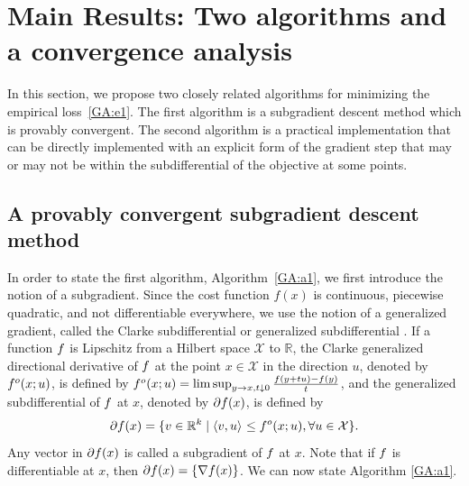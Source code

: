 
\section{Main Results:
Two algorithms and a convergence analysis
} \label{GA:s1}

In this section, we propose two closely related algorithms for minimizing the empirical loss~\eqref{GA:e1}.  The first algorithm is a subgradient descent method which is provably convergent.  The second algorithm is a practical implementation that can be directly implemented with an explicit form of the gradient step that may or may not be within the subdifferential of the objective at some points.

\subsection{A provably convergent subgradient descent method}

In order to state the first algorithm,  Algorithm~\ref{GA:a1}, we first introduce the notion of a subgradient.
Since the cost function $f(x)$ is continuous, piecewise quadratic, and not differentiable everywhere, we use the notion of a generalized gradient, called the Clarke subdifferential or generalized subdifferential \cite{Clason2017}. If a function $\genericf$ is Lipschitz from a Hilbert space $\mathcal{X}$ to $\mathbb{R}$, the Clarke generalized directional derivative of $\genericf$ at the point $x \in \mathcal{X}$ in the direction $u$, denoted by $\genericf^o(x; u)$, is defined by $\genericf^o(x; u) = \limsup_{y \rightarrow x, t \downarrow 0} \frac{\genericf(y + t u) - \genericf(y)}{t}$, and the generalized subdifferential of $\genericf$ at $x$, denoted by $\partial \genericf(x)$, is defined by
\begin{equation*}
\partial \genericf(x) = \{v \in \mathbb{R}^k \mid \inner[]{v}{u} \leq \genericf^o(x; u), \forall u \in \mathcal{X}\}.
\end{equation*}
Any vector in $\partial \genericf(x)$ is called a subgradient of $\genericf$ at $x$. Note that if $\genericf$ is differentiable at $x$, then $\partial \genericf(x) = \{\nabla \genericf(x)\}$.  We can now state Algorithm \ref{GA:a1}.

